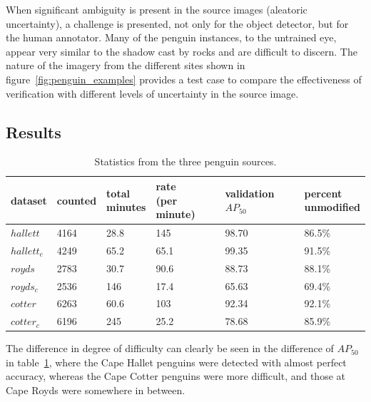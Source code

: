 When significant ambiguity is present in the source images (aleatoric uncertainty), a challenge is presented, not only for the object detector, but for the human annotator. Many of the penguin instances, to the untrained eye, appear very similar to the shadow cast by rocks and are difficult to discern. The nature of the imagery from the different sites shown in figure~\ref{fig:penguin_examples} provides a test case to compare the effectiveness of verification with different levels of uncertainty in the source image. 


\subsection{Results}
\label{sec:penguin_results}

\begin{table}[ht!]
  \centering
    \caption{Statistics from the three penguin sources. }
\begin{tabular}{llllll}
dataset     & counted & \shortstack{total  \\ minutes} & \shortstack{rate \\ (per minute)} & \shortstack {validation \\  $AP_{50}$} & \shortstack{percent \\ unmodified} \\
\toprule
$hallett$   & 4164    & 28.8          & 145               & 98.70     & 86.5\%   \\
$hallett_c$ & 4249    & 65.2          & 65.1              & 99.35     & 91.5\%   \\
$royds$     & 2783    & 30.7          & 90.6              & 88.73     & 88.1\%   \\
$royds_c$   & 2536    & 146           & 17.4              & 65.63     & 69.4\%   \\
$cotter$    & 6263    & 60.6          & 103               & 92.34     & 92.1\%   \\
$cotter_c$  & 6196    & 245           & 25.2              & 78.68     & 85.9\%  \\
\bottomrule
\end{tabular}

\label{tab:penguin_statistics}
\end{table}

The difference in degree of difficulty can clearly be seen in the difference of $AP_{50}$ in table~\ref{tab:penguin_statistics}, where the Cape Hallet penguins were detected with almost perfect accuracy, whereas the Cape Cotter penguins were more difficult, and those at Cape Royds were somewhere in between. 

